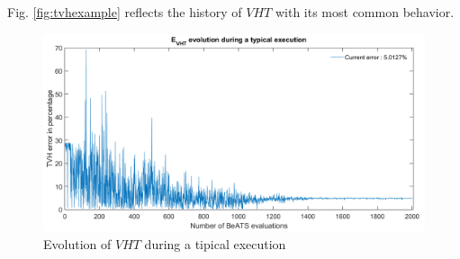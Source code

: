 Fig. \ref{fig:tvhexample} reflects the history of $VHT$ with its most common behavior.
\begin{figure}[h]
	\label{fig:vhtexample}
	\caption{Evolution of $VHT$ during a tipical execution}
	\includegraphics[width=7in]{figures/results_figures/vhtexample.png}
\end{figure}	

